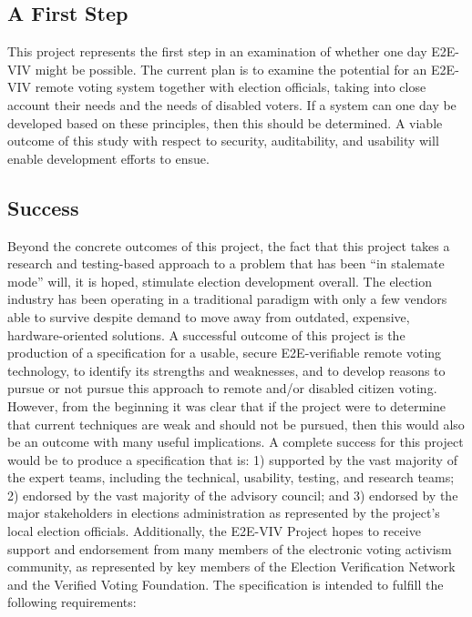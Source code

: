 \subsection{A First Step}
\label{sec:first-step}

This project represents the first step in an examination of whether
one day E2E-VIV might be possible. The current plan is to examine the
potential for an E2E-VIV remote voting system together with election
officials, taking into close account their needs and the needs of
disabled voters. If a system can one day be developed based on these
principles, then this should be determined. A viable outcome of this
study with respect to security, auditability, and usability will
enable development efforts to ensue.

\subsection{Success}
\label{sec:success}

Beyond the concrete outcomes of this project, the fact that this
project takes a research and testing-based approach to a problem that
has been ``in stalemate mode'' will, it is hoped, stimulate election
development overall. The election industry has been operating in a
traditional paradigm with only a few vendors able to survive despite
demand to move away from outdated, expensive, hardware-oriented
solutions. A successful outcome of this project is the production of a
specification for a usable, secure E2E-verifiable remote voting
technology, to identify its strengths and weaknesses, and to develop
reasons to pursue or not pursue this approach to remote and/or
disabled citizen voting. However, from the beginning it was clear that
if the project were to determine that current techniques are weak and
should not be pursued, then this would also be an outcome with many
useful implications. A complete success for this project would be to
produce a specification that is: 1) supported by the vast majority of
the expert teams, including the technical, usability, testing, and
research teams; 2) endorsed by the vast majority of the advisory
council; and 3) endorsed by the major stakeholders in elections
administration as represented by the project's local election
officials. Additionally, the E2E-VIV Project hopes to receive support
and endorsement from many members of the electronic voting activism
community, as represented by key members of the Election Verification
Network and the Verified Voting Foundation. The specification is
intended to fulfill the following requirements:

